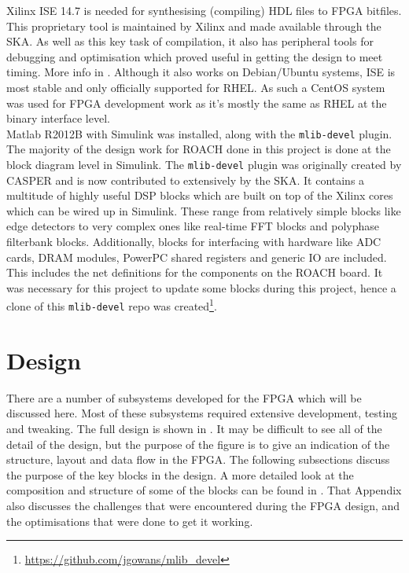 Xilinx ISE 14.7 is needed for synthesising (compiling) HDL files to FPGA bitfiles. This proprietary tool is maintained by Xilinx and made available through the SKA. As well as this key task of compilation, it also has peripheral tools for debugging and optimisation which proved useful in getting the design to meet timing. More info in . Although it also works on Debian/Ubuntu systems, ISE is most stable and only officially supported for RHEL. As such a CentOS system was used for FPGA development work as it's mostly the same as RHEL at the binary interface level.\\

Matlab R2012B with Simulink was installed, along  with the \lstinline{mlib-devel} plugin. The majority of the design work for ROACH done in this project is done at the block diagram level in Simulink. The \lstinline{mlib-devel} plugin was originally created by CASPER and is now contributed to extensively by the SKA. It contains a multitude of highly useful DSP blocks which are built on top of the Xilinx cores which can be wired up in Simulink. These range from relatively simple blocks like edge detectors to very complex ones like real-time FFT blocks and polyphase filterbank blocks. Additionally, blocks for interfacing with hardware like ADC cards, DRAM modules, PowerPC shared registers and generic IO are included. This includes the net definitions for the components on the ROACH board. It was necessary for this project to update some blocks during this project, hence a clone of this \lstinline{mlib-devel} repo was created\footnote{\url{https://github.com/jgowans/mlib_devel}}.


\section{Design}
There are a number of subsystems developed for the FPGA which will be discussed here. Most of these subsystems required extensive development, testing and tweaking. The full design is shown in . It may be difficult to see all of the detail of the design, but the purpose of the figure is to give an indication of the structure, layout and data flow in the FPGA. The following subsections discuss the purpose of the key blocks in the design. A more detailed look at the composition and structure of some of the blocks can be found in . That Appendix also discusses the challenges that were encountered during the FPGA design, and the optimisations that were done to get it working.

